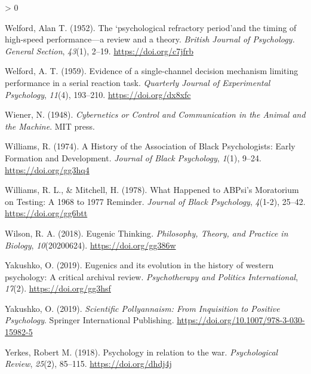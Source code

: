 \documentclass[
  oneside,
  12pt]{crumpbook}
\newlength{\cslhangindent}
\newenvironment{CSLReferences}[2] %
 {%
  \setlength{\parindent}{0pt}
  \ifodd #1 \everypar{\setlength{\hangindent}{\cslhangindent}}\ignorespaces\fi
  \ifnum #2 > 0
  \setlength{\parskip}{#2\baselineskip}
  \fi
 }%
 {}
\begin{document}
\begin{CSLReferences}{1}{0}
\leavevmode\hypertarget{ref-welfordPsychologicalRefractoryPeriod1952}{}%
Welford, Alan T. (1952). The `psychological refractory period'and the timing of high-speed performance---a review and a theory. \emph{British Journal of Psychology. General Section}, \emph{43}(1), 2--19. \url{https://doi.org/c7jfrb}

\leavevmode\hypertarget{ref-welfordEvidenceSinglechannelDecision1959}{}%
Welford, A. T. (1959). Evidence of a single-channel decision mechanism limiting performance in a serial reaction task. \emph{Quarterly Journal of Experimental Psychology}, \emph{11}(4), 193--210. \url{https://doi.org/dx8xfc}

\leavevmode\hypertarget{ref-wienerCyberneticsControlCommunication1948}{}%
Wiener, N. (1948). \emph{Cybernetics or {Control} and {Communication} in the {Animal} and the {Machine}}. {MIT press}.

\leavevmode\hypertarget{ref-williamsHistoryAssociationBlack1974}{}%
Williams, R. (1974). A {History} of the {Association} of {Black Psychologists}: {Early Formation} and {Development}. \emph{Journal of Black Psychology}, \emph{1}(1), 9--24. \url{https://doi.org/gg3hq4}

\leavevmode\hypertarget{ref-williamsWhatHappenedABPsi1978}{}%
Williams, R. L., \& Mitchell, H. (1978). What {Happened} to {ABPsi}'s {Moratorium} on {Testing}: {A} 1968 to 1977 {Reminder}. \emph{Journal of Black Psychology}, \emph{4}(1-2), 25--42. \url{https://doi.org/gg6btt}

\leavevmode\hypertarget{ref-wilsonEugenicThinking2018}{}%
Wilson, R. A. (2018). Eugenic {Thinking}. \emph{Philosophy, Theory, and Practice in Biology}, \emph{10}(20200624). \url{https://doi.org/gg386w}

\leavevmode\hypertarget{ref-yakushkoEugenicsItsEvolution2019}{}%
Yakushko, O. (2019). Eugenics and its evolution in the history of western psychology: {A} critical archival review. \emph{Psychotherapy and Politics International}, \emph{17}(2). \url{https://doi.org/gg3hsf}

\leavevmode\hypertarget{ref-yakushkoScientificPollyannaismInquisition2019}{}%
Yakushko, O. (2019). \emph{Scientific {Pollyannaism}: {From Inquisition} to {Positive Psychology}}. {Springer International Publishing}. \url{https://doi.org/10.1007/978-3-030-15982-5}

\leavevmode\hypertarget{ref-yerkesPsychologyRelationWar1918}{}%
Yerkes, Robert M. (1918). Psychology in relation to the war. \emph{Psychological Review}, \emph{25}(2), 85--115. \url{https://doi.org/dhdj4j}


\end{CSLReferences}
\end{document}
